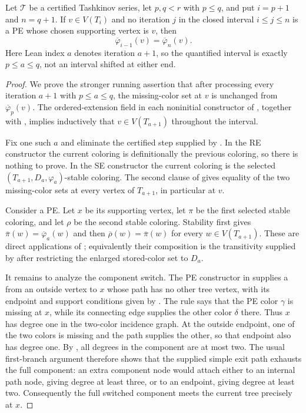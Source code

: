 \begin{lemma}
Let \(\mathcal T\) be a certified Tashkinov series, let \(p,q<r\) with
\(p\leq q\), and put \(i=p+1\) and \(n=q+1\).  If
\(v\in V(T_i)\) and no iteration \(j\) in the closed interval
\(i\leq j\leq n\) is a PE whose chosen supporting vertex is \(v\), then
\[
 \overline\varphi_{i-1}(v)=\overline\varphi_n(v).
\]
Here Lean index \(a\) denotes iteration \(a+1\), so the quantified
interval is exactly \(p\leq a\leq q\), not an interval shifted at either
end.
\end{lemma}
\begin{proof}
We prove the stronger running assertion that after processing every
iteration \(a+1\) with \(p\leq a\leq q\), the missing-color set at \(v\)
is unchanged from \(\overline\varphi_p(v)\).  The ordered-extension field
in each noninitial constructor of , together
with , implies inductively that
\(v\in V(T_{a+1})\) throughout the interval.

Fix one such \(a\) and eliminate the certified step supplied by
.  In the RE constructor the current coloring is
definitionally the previous coloring, so there is nothing to prove.  In
the SE constructor the current coloring is the selected
\((T_{a+1},D_a,\varphi_a)\)-stable coloring.  The second clause of
 gives equality of the two missing-color sets at
every vertex of \(T_{a+1}\), in particular at \(v\).

Consider a PE.  Let \(x\) be its supporting vertex, let \(\pi\) be the
first selected stable coloring, and let \(\rho\) be the second stable
coloring.  Stability first gives
\(\overline\pi(w)=\overline\varphi_a(w)\) and then
\(\overline\rho(w)=\overline\pi(w)\) for every
\(w\in V(T_{a+1})\).  These are direct applications of
; equivalently their composition is the
transitivity supplied by  after restricting the enlarged
stored-color set to \(D_a\).

It remains to analyze the component switch.  The PE constructor in
 supplies a  from an
outside vertex to \(x\) whose path has no other tree vertex, with its
endpoint and support conditions given by .  The
rule  says that the PE color
\(\gamma\) is missing at \(x\), while its connecting edge supplies the
other color \(\delta\) there.  Thus \(x\) has degree one in the
two-color incidence graph.  At the outside endpoint, one of the two colors
is missing and the path supplies the other, so that endpoint also has
degree one.  By , all degrees in
the component are at most two.  The usual first-branch argument therefore
shows that the supplied simple exit path exhausts the full component: an
extra component node would attach either to an internal path node, giving
degree at least three, or to an endpoint, giving degree at least two.
Consequently the full switched component meets the current tree precisely
at \(x\).


\end{proof}
